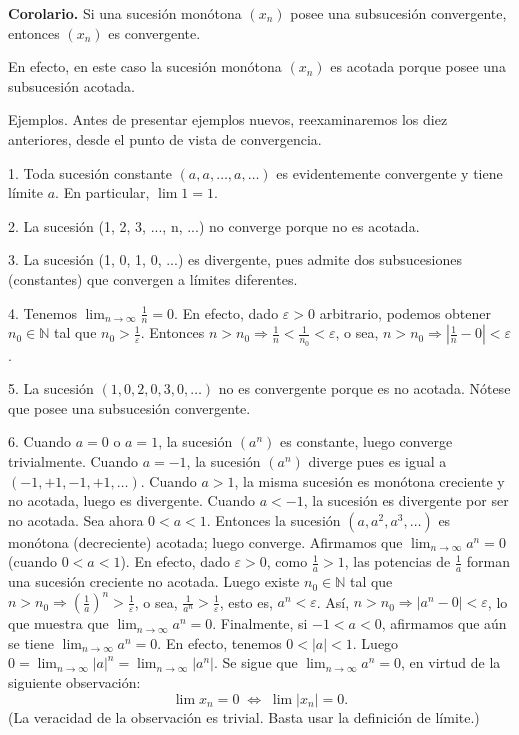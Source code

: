 \documentclass[12pt,oneside]{book}
\begin{document}
\textbf{Corolario.} Si una sucesión monótona \((x_n)\) posee una subsucesión convergente, entonces \((x_n)\) es convergente.

En efecto, en este caso la sucesión monótona \((x_n)\) es acotada porque posee una subsucesión acotada.

Ejemplos. Antes de presentar ejemplos nuevos, reexaminaremos los diez anteriores, desde el punto de vista de convergencia.

1. Toda sucesión constante \((a, a, \dots, a, \dots)\) es evidentemente convergente y tiene límite \(a\). En particular, \(\lim 1 = 1\).

2. La sucesión (1, 2, 3, ..., n, ...) no converge porque no es acotada.

3. La sucesión (1, 0, 1, 0, ...) es divergente, pues admite dos subsucesiones (constantes) que convergen a límites diferentes.

4. Tenemos \(\lim_{n \to \infty} \frac{1}{n} = 0\). En efecto, dado \(\varepsilon > 0\) arbitrario, podemos obtener \(n_0 \in \mathbb{N}\) tal que \(n_0 > \frac{1}{\varepsilon}\). Entonces \(n > n_0 \Rightarrow \frac{1}{n} < \frac{1}{n_0} < \varepsilon\), o sea, \(n > n_0 \Rightarrow \left|\frac{1}{n} - 0\right| < \varepsilon\).

5. La sucesión \((1, 0, 2, 0, 3, 0, \dots)\) no es convergente porque es no acotada. Nótese que posee una subsucesión convergente.

6. Cuando \(a = 0\) o \(a = 1\), la sucesión \((a^n)\) es constante, luego converge trivialmente. Cuando \(a = -1\), la sucesión \((a^n)\) diverge pues es igual a \((-1, +1, -1, +1, \dots)\). Cuando \(a > 1\), la misma sucesión es monótona creciente y no acotada, luego es divergente. Cuando \(a < -1\), la sucesión es divergente por ser no acotada. Sea ahora \(0 < a < 1\). Entonces la sucesión \((a, a^2, a^3, \dots)\) es monótona (decreciente) acotada; luego converge. Afirmamos que \(\lim_{n \to \infty} a^n = 0\) (cuando \(0 < a < 1\)). En efecto, dado \(\varepsilon > 0\), como \(\frac{1}{a} > 1\), las potencias de \(\frac{1}{a}\) forman una sucesión creciente no acotada. Luego existe \(n_0 \in \mathbb{N}\) tal que \(n > n_0 \Rightarrow \left(\frac{1}{a}\right)^n > \frac{1}{\varepsilon}\), o sea, \(\frac{1}{a^n} > \frac{1}{\varepsilon}\), esto es, \(a^n < \varepsilon\). Así, \(n > n_0 \Rightarrow |a^n - 0| < \varepsilon\), lo que muestra que \(\lim_{n \to \infty} a^n = 0\). Finalmente, si \(-1 < a < 0\), afirmamos que aún se tiene \(\lim_{n \to \infty} a^n = 0\). En efecto, tenemos \(0 < |a| < 1\). Luego \(0 = \lim_{n \to \infty} |a|^n = \lim_{n \to \infty} |a^n|\). Se sigue que \(\lim_{n \to \infty} a^n = 0\), en virtud de la siguiente observación:
\[
\lim x_n = 0 \;\Leftrightarrow\; \lim |x_n| = 0.
\]
(La veracidad de la observación es trivial. Basta usar la definición de límite.)
\end{document}
